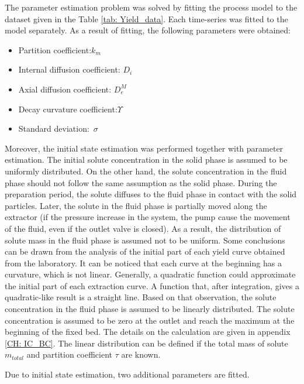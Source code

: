 \documentclass[../Article_Model_Parameters.tex]{subfiles}
\begin{document}
	
	\label{CH: Results}

    The parameter estimation problem was solved by fitting the process model to the dataset given in the Table \ref{tab: Yield_data}. Each time-series was fitted to the model separately. As a result of fitting, the following parameters were obtained:

    \begin{itemize}
        \item Partition coefficient:\qquad\quad\qquad$k_m$
        \item Internal diffusion coefficient: \quad$D_i$
        \item Axial diffusion coefficient: \qquad$D_e^M$
        \item Decay curvature coefficient:\qquad$\Upsilon$
        \item Standard deviation:\qquad\qquad\quad~$\sigma$
    \end{itemize}

    Moreover, the initial state estimation was performed together with parameter estimation. The initial solute concentration in the solid phase is assumed to be uniformly distributed. On the other hand, the solute concentration in the fluid phase should not follow the same assumption as the solid phase. During the preparation period, the solute diffuses to the fluid phase in contact with the solid particles. Later, the solute in the fluid phase is partially moved along the extractor (if the pressure increase in the system, the pump cause the movement of the fluid, even if the outlet valve is closed). As a result, the distribution of solute mass in the fluid phase is assumed not to be uniform. Some conclusions can be drawn from the analysis of the initial part of each yield curve obtained from the laboratory. It can be noticed that each curve at the beginning has a curvature, which is not linear. Generally, a quadratic function could approximate the initial part of each extraction curve. A function that, after integration, gives a quadratic-like result is a straight line. Based on that observation, the solute concentration in the fluid phase is assumed to be linearly distributed. The solute concentration is assumed to be zero at the outlet and reach the maximum at the beginning of the fixed bed. The details on the calculation are given in appendix \ref{CH: IC_BC}. The linear distribution can be defined if the total mass of solute $m_{total}$ and partition coefficient $\tau$ are known.
    
    Due to initial state estimation, two additional parameters are fitted.
\end{document}
